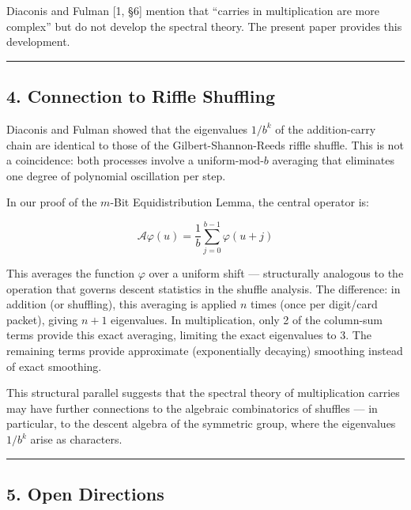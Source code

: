\documentclass[
  11pt,
]{article}
\begin{document}
Diaconis and Fulman {[}1, §6{]} mention that ``carries in multiplication are
more complex'' but do not develop the spectral theory. The present paper
provides this development.

\begin{center}\rule{0.5\linewidth}{0.5pt}\end{center}

\newpage

\subsection{4. Connection to Riffle
Shuffling}\label{connection-to-riffle-shuffling}

Diaconis and Fulman showed that the eigenvalues \(1/b^k\) of the addition-carry
chain are identical to those of the Gilbert-Shannon-Reeds riffle shuffle. This
is not a coincidence: both processes involve a uniform-mod-\(b\) averaging that
eliminates one degree of polynomial oscillation per step.

In our proof of the \(m\)-Bit Equidistribution Lemma, the central operator is:

\[\mathcal{A}\varphi(u) = \frac{1}{b}\sum_{j=0}^{b-1}\varphi(u+j)\]

This averages the function \(\varphi\) over a uniform shift --- structurally
analogous to the operation that governs descent statistics in the shuffle
analysis. The difference: in addition (or shuffling), this averaging is applied
\(n\) times (once per digit/card packet), giving \(n+1\) eigenvalues. In
multiplication, only 2 of the column-sum terms provide this exact averaging,
limiting the exact eigenvalues to 3. The remaining terms provide approximate
(exponentially decaying) smoothing instead of exact smoothing.

This structural parallel suggests that the spectral theory of multiplication
carries may have further connections to the algebraic combinatorics of shuffles
--- in particular, to the descent algebra of the symmetric group, where the
eigenvalues \(1/b^k\) arise as characters.

\begin{center}\rule{0.5\linewidth}{0.5pt}\end{center}

\newpage

\subsection{5. Open Directions}\label{open-directions}
\end{document}
